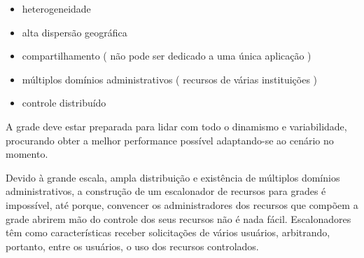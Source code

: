 \begin{itemize}
	\item heterogeneidade
	\item alta dispersão geográfica
	\item compartilhamento ( não pode ser dedicado a uma única aplicação )
	\item múltiplos domínios administrativos ( recursos de várias instituições )
	\item controle distribuído 
\end{itemize}

A grade deve estar preparada para lidar com todo o dinamismo e variabilidade, procurando obter a melhor performance possível adaptando-se ao cenário no momento.

Devido à grande escala, ampla distribuição e existência de múltiplos domínios administrativos, a construção de um escalonador de recursos para grades é impossível, até porque, convencer os administradores dos recursos que compõem a grade abrirem mão do controle dos seus recursos não é nada fácil. Escalonadores têm como características receber solicitações de vários usuários, arbitrando, portanto, entre os usuários, o uso dos recursos controlados.